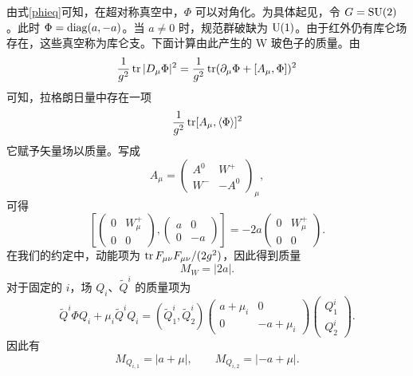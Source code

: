 由式\eqref{phieq}可知，在超对称真空中，$\Phi$ 可以对角化。为具体起见，令 $G=\mathop{\mathrm{SU}}(2)$。此时 $\Phi=\mathop{\mathrm{diag}}(a,-a)$。当 $a\neq0$ 时，规范群破缺为 ${\mathrm{U}}(1)$。由于红外仍有库仑场存在，这些真空称为库仑支。下面计算由此产生的 W 玻色子的质量。由
\begin{equation}
\frac1{g^2}\mathop{\mathrm{tr}}\nolimits|D_\mu \Phi|^2 = \frac1{g^2}\mathop{\mathrm{tr}}\nolimits (\partial_\mu \Phi+[A_\mu,\Phi])^2
\end{equation}
可知，拉格朗日量中存在一项
\begin{equation}
\frac1{g^2}\mathop{\mathrm{tr}}\nolimits [A_\mu,\langle\Phi\rangle]^2
\end{equation}
它赋予矢量场以质量。写成
\begin{equation}
A_\mu=\begin{pmatrix}A^0 & W^+ \\W^- & -A^0\end{pmatrix}_\mu,
\end{equation}
可得
\begin{equation}
\left[
\begin{pmatrix}0 & W^+_\mu \\0 & 0\end{pmatrix},
\begin{pmatrix}a & 0\\0 & -a\end{pmatrix}
\right]=-2a \begin{pmatrix}0 & W^+_\mu \\0 & 0\end{pmatrix}.
\end{equation}
在我们的约定中，动能项为 $\mathop{\mathrm{tr}}\nolimits F_{\mu\nu}F_{\mu\nu}/(2g^2)$，因此得到质量
\begin{equation}
M_W=|2a|.
\end{equation}
对于固定的 $i$，场 $Q_i$、$\tilde Q^i$ 的质量项为
\begin{equation}
\tilde Q^i \Phi Q_i+ \mu_i \tilde Q^i Q_i =
(\tilde Q_1^i, \tilde Q_2^i)
\begin{pmatrix}a+\mu_i & 0 \\0 & -a+\mu_i\end{pmatrix}
\begin{pmatrix}Q_1^i \\Q_2^i\end{pmatrix}.
\end{equation}
因此有
\begin{equation}
M_{Q_{i,1}}=|a+\mu|,\qquad
M_{Q_{i,2}}=|{-a}+\mu|.
\end{equation}

